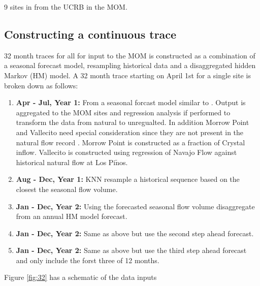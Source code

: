 \documentclass[final,5p,times,twocolumn,authoryear]{elsarticle}
\begin{document}
9 sites in from the UCRB in the MOM. 

\subsection{Constructing a continuous trace}
32 month traces for all for input to the MOM is constructed as a combination of a seasonal forecast model, resampling historical data and a disaggregated hidden Markov (HM) model. A 32 month trace starting on April 1st for a single site is broken down as follows:

\begin{enumerate}
\item {\bf Apr - Jul, Year 1:} From a seasonal forcast model similar to \cite{Bracken:2010cw}.  Output is aggregated to the MOM sites and regression analysis if performed to transform the data from natural to unregualted. In addition Morrow Point and Vallecito need special consideration since they are not present in the natural flow record \cite{Prairie:2005tl}. Morrow Point is constructed as a fraction of Crystal inflow. Vallecito is constructed using regression of Navajo Flow against historical natural flow at Los Pi$\tilde{\mbox{n}}$os.

\item {\bf Aug - Dec, Year 1:} KNN resample \citep{Lall:1995wk} a historical sequence based on the closest the seasonal flow volume. 

\item {\bf Jan - Dec, Year 2:} Using the forecasted seasonal flow volume disaggregate \citep{Nowak:2010ha} from an annual HM model forecast.

\item {\bf Jan - Dec, Year 2:} Same as above but use the second step ahead forecast. 

\item {\bf Jan - Dec, Year 2:} Same as above but use the third step ahead forecast and only include the forst three of 12 months. 
\end{enumerate}

Figure \ref{fig:32} has a schematic of the data inputs

\begin{figure*}
\centering

\caption{Construction of single trace.}\label{fig:32}
\end{figure*}



\end{document}

